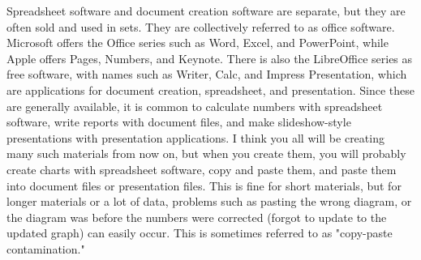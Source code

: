 \documentclass{ltjsbook}
\begin{document}
Spreadsheet software and document creation software are separate, but they are often sold and used in sets. They are collectively referred to as office software. Microsoft offers the Office series such as Word, Excel, and PowerPoint, while Apple offers Pages, Numbers, and Keynote. There is also the LibreOffice series as free software, with names such as Writer, Calc, and Impress Presentation, which are applications for document creation, spreadsheet, and presentation. Since these are generally available, it is common to calculate numbers with spreadsheet software, write reports with document files, and make slideshow-style presentations with presentation applications. I think you all will be creating many such materials from now on, but when you create them, you will probably create charts with spreadsheet software, copy and paste them, and paste them into document files or presentation files. This is fine for short materials, but for longer materials or a lot of data, problems such as pasting the wrong diagram, or the diagram was before the numbers were corrected (forgot to update to the updated graph) can easily occur. This is sometimes referred to as "copy-paste contamination."
\end{document}
